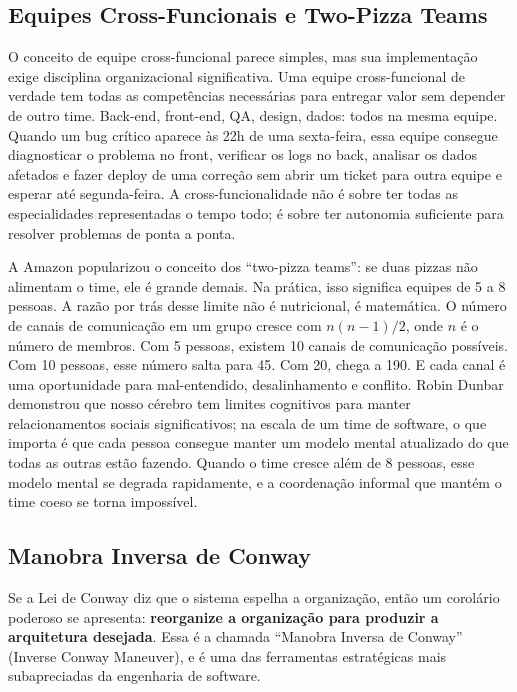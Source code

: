 \subsection{Equipes Cross-Funcionais e Two-Pizza Teams}

O conceito de equipe cross-funcional parece simples, mas sua implementação
exige disciplina organizacional significativa. Uma equipe cross-funcional de
verdade tem todas as competências necessárias para entregar valor sem
depender de outro time. Back-end, front-end, QA, design, dados: todos na
mesma equipe. Quando um bug crítico aparece às 22h de uma sexta-feira, essa
equipe consegue diagnosticar o problema no front, verificar os logs no back,
analisar os dados afetados e fazer deploy de uma correção sem abrir um ticket
para outra equipe e esperar até segunda-feira. A cross-funcionalidade não é
sobre ter todas as especialidades representadas o tempo todo; é sobre ter
autonomia suficiente para resolver problemas de ponta a ponta.

A Amazon popularizou o conceito dos ``two-pizza teams'': se duas pizzas não
alimentam o time, ele é grande demais. Na prática, isso significa equipes de 5
a 8 pessoas. A razão por trás desse limite não é nutricional, é matemática.
O número de canais de comunicação em um grupo cresce com $n(n-1)/2$, onde $n$ é
o número de membros. Com 5 pessoas, existem 10 canais de comunicação possíveis.
Com 10 pessoas, esse número salta para 45. Com 20, chega a 190. E cada canal
é uma oportunidade para mal-entendido, desalinhamento e conflito. Robin Dunbar
demonstrou que nosso cérebro tem limites cognitivos para manter relacionamentos
sociais significativos; na escala de um time de software, o que importa é que
cada pessoa consegue manter um modelo mental atualizado do que todas as outras
estão fazendo. Quando o time cresce além de 8 pessoas, esse modelo mental se
degrada rapidamente, e a coordenação informal que mantém o time coeso se torna
impossível.

\subsection{Manobra Inversa de Conway}

Se a Lei de Conway diz que o sistema espelha a organização, então um corolário
poderoso se apresenta: \textbf{reorganize a organização para produzir a
arquitetura desejada}. Essa é a chamada ``Manobra Inversa de Conway'' (Inverse
Conway Maneuver), e é uma das ferramentas estratégicas mais subapreciadas da
engenharia de software.

